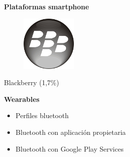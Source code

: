 \begin{slide}
\begin{block}{\textbf{Plataformas smartphone}}
\begin{center}
\begin{minipage}[b]{0.4\linewidth}
      \end{minipage}
      \begin{minipage}[b]{0.4\linewidth}
        \begin{center}
          \begin{figure}[!h]
            \includegraphics[height=0.25\textheight]{img/blackberry.png}
          \end{figure}
          Blackberry (1,7\%)
        \end{center}
      \end{minipage}
    \end{center}
  \end{block}
\end{slide}

\begin{slide}
  \begin{block}{\textbf{Wearables}}
    \begin{itemize}
      \item Perfiles bluetooth
      \item Bluetooth con aplicación propietaria
      \item Bluetooth con Google Play Services
    \end{itemize}
  \end{block}
\end{slide}

